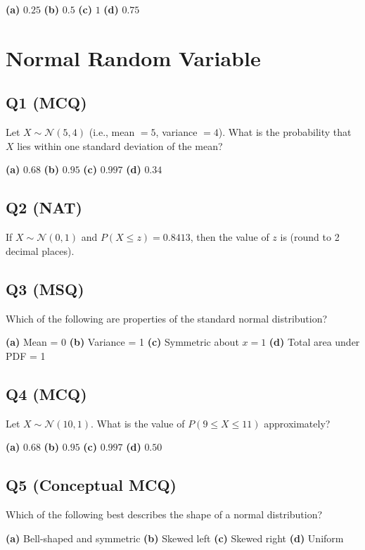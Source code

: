 \textbf{(a)} $0.25$  
\textbf{(b)} $0.5$  
\textbf{(c)} $1$  
\textbf{(d)} $0.75$

\section{Normal Random Variable}

\subsection*{Q1 (MCQ)}
Let $X \sim \mathcal{N}(5, 4)$ (i.e., mean $= 5$, variance $= 4$). What is the probability that $X$ lies within one standard deviation of the mean?

\textbf{(a)} $0.68$  
\textbf{(b)} $0.95$  
\textbf{(c)} $0.997$  
\textbf{(d)} $0.34$

\subsection*{Q2 (NAT)}
If $X \sim \mathcal{N}(0, 1)$ and $P(X \leq z) = 0.8413$, then the value of $z$ is \underline{\hspace{2cm}} (round to 2 decimal places).

\subsection*{Q3 (MSQ)}
Which of the following are properties of the standard normal distribution?

\textbf{(a)} Mean = 0  
\textbf{(b)} Variance = 1  
\textbf{(c)} Symmetric about $x = 1$  
\textbf{(d)} Total area under PDF = 1

\subsection*{Q4 (MCQ)}
Let $X \sim \mathcal{N}(10, 1)$. What is the value of $P(9 \leq X \leq 11)$ approximately?

\textbf{(a)} $0.68$  
\textbf{(b)} $0.95$  
\textbf{(c)} $0.997$  
\textbf{(d)} $0.50$

\subsection*{Q5 (Conceptual MCQ)}
Which of the following best describes the shape of a normal distribution?

\textbf{(a)} Bell-shaped and symmetric  
\textbf{(b)} Skewed left  
\textbf{(c)} Skewed right  
\textbf{(d)} Uniform

